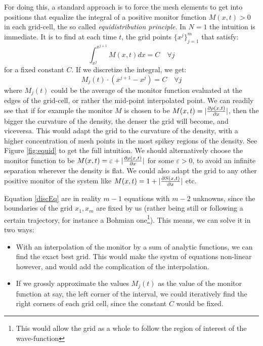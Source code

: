 \documentclass[11pt, a4paper]{article} %
\begin{document}
For doing this, a standard approach is to force the mesh elements to get into positions that equalize the integral of a positive monitor function $M(x,t)>0$ in each grid-cell, the so called {\em equidistribution principle}. In $N=1$ the intuition is immediate. It is to find at each time $t$, the grid points $\{x^j\}_{j=1}^m$ that satisfy:
\begin{equation}
\int^{x^{j+1}}_{x^j} M(x,t) dx =C \quad \forall j
\end{equation}
for a fixed constant $C$. If we discretize the integral, we get:
\begin{equation}\label{discEq}
M_j(t)\cdot (x^{j+1}-x^j)=C \quad \forall j
\end{equation}
where $M_j(t)$ could be the average of the monitor function evaluated at the edges of the grid-cell, or rather the mid-point interpolated point. We can readily see that if for example the monitor $M$ is chosen to be $M(x,t)=|\pdv{\rho(x,t)}{x}|$, then the bigger the curvature of the density, the denser the grid will become, and viceversa. This would adapt the grid to the curvature of the density, with a higher concentration of mesh points in the most spikey regions of the density. See Figure \ref{fig:equid} to get the full intuition. We should alternatively choose the monitor function to be $M(x,t)=\varepsilon+|\pdv{\rho(x,t)}{x}|$ for some $\varepsilon>0$, to avoid an infinite separation wherever the density is flat. We could also adapt the grid to any other positive monitor of the system like $M(x,t)=1+|\pdv{S(x,t)}{x}|$ etc.

Equation \eqref{discEq} are in reality $m-1$ equations with $m-2$ unknowns, since the boundaries of the grid $x_1, x_m$ are fixed by us (rather being still or following a certain trajectory, for instance a Bohmian one\footnote{This would allow the grid as a whole to follow the region of interest of the wave-function}). This means, we can solve it in two ways: 
\begin{itemize}
\item With an interpolation of the monitor by a sum of analytic functions, we can find the exact best grid. This would make the systm of equations non-linear however, and would add the complication of the interpolation.

\item If we grossly approximate the values $M_j(t)$ as the value of the monitor function at say, the left corner of the interval, we could iteratively find the right corners of each grid cell, since the constant $C$ would be fixed.
\end{itemize}
\end{document}
